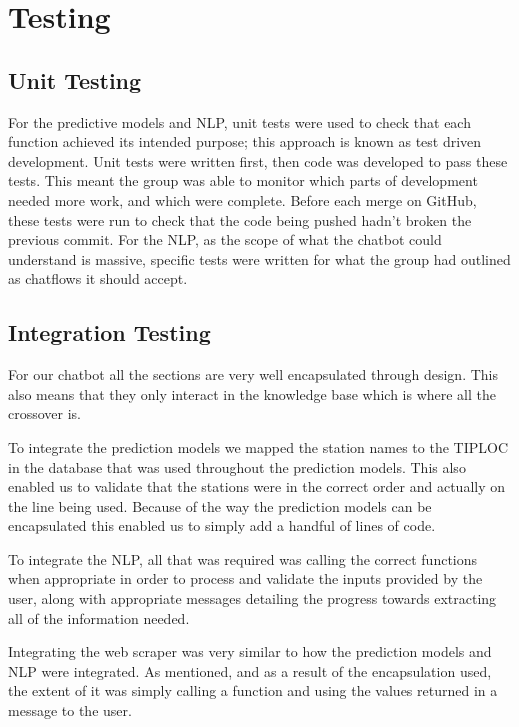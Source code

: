 \documentclass[11pt]{article}
\begin{document}
	\clearpage
	\section{Testing} \label{Testing}
	
	\subsection{Unit Testing}
	For the predictive models and NLP, unit tests were used to check that each function achieved its intended purpose; this approach is known as test driven development. Unit tests were written first, then code was developed to pass these tests. This meant the group was able to monitor which parts of development needed more work, and which were complete. Before each merge on GitHub, these tests were run to check that the code being pushed hadn’t broken the previous commit. For the NLP, as the scope of what the chatbot could understand is massive, specific tests were written for what the group had outlined as chatflows it should accept. 
	
	
	\subsection{Integration Testing}
	
	For our chatbot all the sections are very well encapsulated through design. This also means that they only interact in the knowledge base which is where all the crossover is. 
	
	To integrate the prediction models we mapped the station names to the TIPLOC in the database that was used throughout the prediction models. This also enabled us to validate that the stations were in the correct order and actually on the line being used. Because of the way the prediction models can be encapsulated this enabled us to simply add a handful of lines of code.
	
	To integrate the NLP, all that was required was calling the correct functions when appropriate in order to process and validate the inputs provided by the user, along with appropriate messages detailing the progress towards extracting all of the information needed.
	
	Integrating the web scraper was very similar to how the prediction models and NLP were integrated. As mentioned, and as a result of the encapsulation used, the extent of it was simply calling a function and using the values returned in a message to the user.
	
\end{document}
